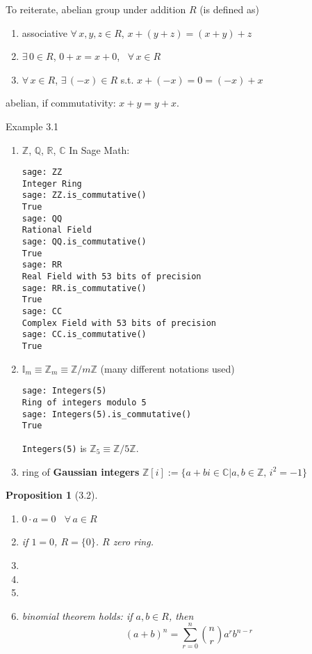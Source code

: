 \documentclass[twoside,landscape]{amsart}
\theoremstyle{plain}
\newtheorem{proposition}{Proposition}
\theoremstyle{definition}
\theoremstyle{remark}
\begin{document}
\begin{multicols*}{2}
To reiterate, abelian group under addition $R$ (is defined as)
\begin{enumerate}
\item associative $\forall \, x , y ,z \in R$, $x + (y+z) = (x+y)+z$ 
\item $\exists \, 0 \in R$, $0+x = x + 0$, \, $\forall \, x \in R$ 
\item $\forall \, x \in R$, $\exists \, (-x) \in R$ s.t. $x+(-x) = 0 = (-x) + x$
  \end{enumerate}
abelian, if commutativity: $x+y=y+x$.  

Example 3.1 
\begin{enumerate}
\item[(i)] $\mathbb{Z}$, $\mathbb{Q}$, $\mathbb{R}$, $\mathbb{C}$
In Sage Math:

\begin{lstlisting}
sage: ZZ
Integer Ring
sage: ZZ.is_commutative()
True
sage: QQ
Rational Field
sage: QQ.is_commutative()
True
sage: RR
Real Field with 53 bits of precision
sage: RR.is_commutative()
True
sage: CC
Complex Field with 53 bits of precision
sage: CC.is_commutative()
True
\end{lstlisting}



\item[(ii)] $\mathbb{I}_m \equiv \mathbb{Z}_m \equiv \mathbb{Z}/m\mathbb{Z}$ (many different notations used)

\begin{lstlisting}
sage: Integers(5)
Ring of integers modulo 5
sage: Integers(5).is_commutative()
True
\end{lstlisting}

\verb|Integers(5)| is $\mathbb{Z}_5 \equiv \mathbb{Z}/5\mathbb{Z}$.  
\item[(iii)]  ring of \textbf{Gaussian integers} $\mathbb{Z}[i] := \lbrace a  +bi \in \mathbb{C} | a,b \in \mathbb{Z}, \, i^2 = -1 \rbrace$
\end{enumerate}

\begin{proposition}[3.2]
\begin{enumerate}
\item[(i)] $0\cdot a = 0$ \quad \, $\forall \, a \in R$ 
\item[(ii)] if $1=0$, $R = \lbrace 0 \rbrace$.  $R$ zero ring.  
\item[(iii)]
\item[(iv)]
\item[(v)]
\item[(vi)] binomial theorem holds: if $a,b \in R$, then
\[
(a+b)^n = \sum_{r=0}^n \binom{n}{r} a^rb^{n-r}
\]
\end{enumerate}
\end{proposition}



\end{multicols*}
\end{document}
